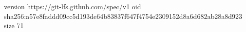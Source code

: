 version https://git-lfs.github.com/spec/v1
oid sha256:a57e8faddd09cc5d193de64b83837f647f4754e2309152d8a6d682ab28a8d923
size 71
